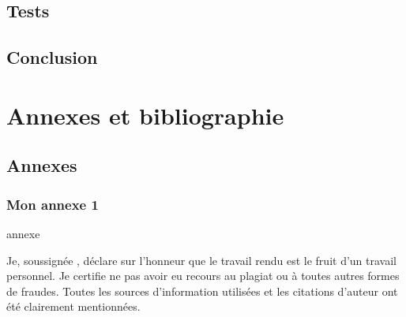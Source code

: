 \documentclass[a4paper,oneside,11pt]{book}
\begin{document}
\chapter{Tests}\label{chap:tests}
\myminitoc


\chapter{Conclusion}\label{chap:conclusion}


\part{Annexes et bibliographie}

\renewcommand{\thechapter}{}
\renewcommand{\thesection}{\Alph{section}}

\clearpage
{}
{}
\nocite{*} %
\begingroup
\raggedright
\sloppy
\printbibliography
\endgroup

\chapter{Annexes}
\section{Mon annexe 1}\label{annexe:1}
annexe
\clearpage

Je, soussignée \authorname, déclare sur l'honneur que le travail rendu est le fruit d'un travail personnel. Je certifie ne pas avoir eu recours au plagiat ou à toutes autres formes de fraudes. Toutes les sources d'information utilisées et les citations d'auteur ont été clairement mentionnées.
\end{document}

